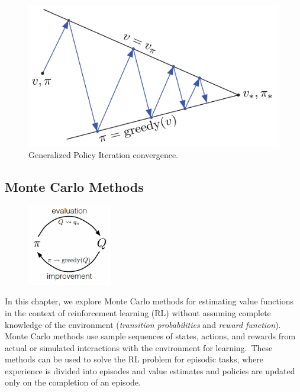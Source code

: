 \documentclass[../xlapes02]{subfiles}
\begin{document}
    \begin{figure}[H]
        \centering
        \begin{minipage}[b]{0.5\textwidth}
            \includegraphics[width=\textwidth]{image/gpi2}
            \caption{Generalized Policy Iteration convergence.}
            \label{fig:gpi}
        \end{minipage}
    \end{figure}

    \subsection{Monte Carlo Methods}\label{subsec:monte-carlo-methods}
    \begin{figure}
        \begin{center}
            \includegraphics[width=0.33\textwidth]{image/mc-evaluation-improvement}
        \end{center}
    \end{figure}

    In this chapter, we explore Monte Carlo methods for estimating value functions in the context of reinforcement learning (RL) without assuming complete knowledge of the environment (\emph{transition probabilities} and \emph{reward function}). Monte Carlo methods use sample sequences of states, actions, and rewards from actual or simulated interactions with the environment for learning.\ These methods can be used to solve the RL problem for episodic tasks, where experience is divided into episodes and value estimates and policies are updated only on the completion of an episode.
\end{document}
